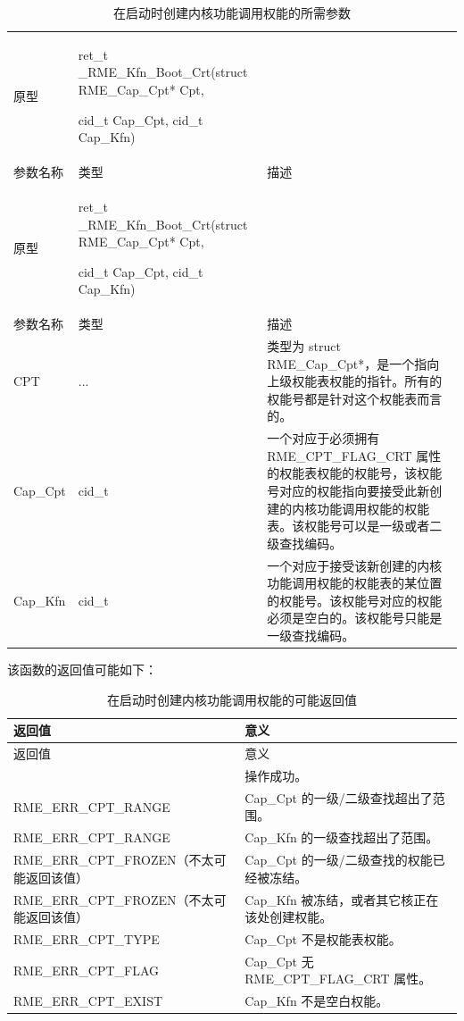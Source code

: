 \begin{xltabular}{\textwidth}{@{}>{\hsize\raggedright\arraybackslash}X>{\hsize\raggedright\arraybackslash}X>{\hsize\raggedright\arraybackslash}X@{}}
\caption{在启动时创建内核功能调用权能的所需参数}\label{tab:7-53-create-kernel-function-capability-at-boot-parameters}\\
\toprule
原型\strut
 & ret\_t \_RME\_Kfn\_Boot\_Crt(struct RME\_Cap\_Cpt* Cpt,

cid\_t Cap\_Cpt, cid\_t Cap\_Kfn)\strut
 & \strut
\tabularnewline
参数名称 & 类型 & 描述\tabularnewline
\endfirsthead
\toprule
原型\strut
 & ret\_t \_RME\_Kfn\_Boot\_Crt(struct RME\_Cap\_Cpt* Cpt,

cid\_t Cap\_Cpt, cid\_t Cap\_Kfn)\strut
 & \strut
\tabularnewline
参数名称 & 类型 & 描述\tabularnewline
\midrule
\endhead
\bottomrule
\endlastfoot
CPT & ... &
类型为 struct RME\_Cap\_Cpt*，是一个指向上级权能表权能的指针。所有的权能号都是针对这个权能表而言的。\tabularnewline
Cap\_Cpt & cid\_t &
一个对应于必须拥有 RME\_CPT\_FLAG\_CRT 属性的权能表权能的权能号，该权能号对应的权能指向要接受此新创建的内核功能调用权能的权能表。该权能号可以是一级或者二级查找编码。\tabularnewline
Cap\_Kfn & cid\_t &
一个对应于接受该新创建的内核功能调用权能的权能表的某位置的权能号。该权能号对应的权能必须是空白的。该权能号只能是一级查找编码。\tabularnewline
\end{xltabular}

该函数的返回值可能如下：

\begin{xltabular}{\textwidth}{@{}>{\hsize\raggedright\arraybackslash}X>{\hsize\raggedright\arraybackslash}X@{}}
\caption{在启动时创建内核功能调用权能的可能返回值}\label{tab:7-54-create-kernel-function-capability-at-boot-return-values}\\
\toprule
返回值 & 意义\tabularnewline
\endfirsthead
\toprule
返回值 & 意义\tabularnewline
\midrule
\endhead
\bottomrule
{} & 操作成功。\tabularnewline
    RME\_ERR\_CPT\_RANGE & Cap\_Cpt 的一级/二级查找超出了范围。\tabularnewline
    RME\_ERR\_CPT\_RANGE & Cap\_Kfn 的一级查找超出了范围。\tabularnewline
    RME\_ERR\_CPT\_FROZEN（不太可能返回该值） & Cap\_Cpt 的一级/二级查找的权能已经被冻结。\tabularnewline
    RME\_ERR\_CPT\_FROZEN（不太可能返回该值） & Cap\_Kfn 被冻结，或者其它核正在该处创建权能。\tabularnewline
    RME\_ERR\_CPT\_TYPE & Cap\_Cpt 不是权能表权能。\tabularnewline
    RME\_ERR\_CPT\_FLAG & Cap\_Cpt 无 RME\_CPT\_FLAG\_CRT 属性。\tabularnewline
    RME\_ERR\_CPT\_EXIST & Cap\_Kfn 不是空白权能。\tabularnewline
\end{xltabular}

